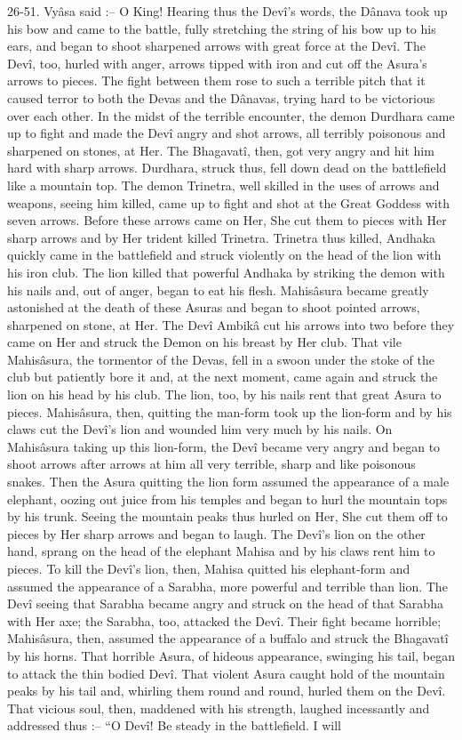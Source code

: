 26-51. Vy\^asa said :-- O King! Hearing thus the Dev\^i's words, the D\^anava took up his bow and came to the battle, fully stretching the string of his bow up to his ears, and began to shoot sharpened arrows with great force at the Dev\^i. The Dev\^i, too, hurled with anger, arrows tipped with iron and cut off the Asura's arrows to pieces. The fight between them rose to such a terrible pitch that it caused terror to both the Devas and the D\^anavas, trying hard to be victorious over each other. In the midst of the terrible encounter, the demon Durdhara came up to fight and made the Dev\^i angry and shot arrows, all terribly poisonous and sharpened on stones, at Her. The Bhagavat\^i, then, got very angry and hit him hard with sharp arrows. Durdhara, struck thus, fell down dead on the battlefield like a mountain top. The demon Trinetra, well skilled in the uses of arrows and weapons, seeing him killed, came up to fight and shot at the Great Goddess with seven arrows. Before these arrows came on Her, She cut them to pieces with Her sharp arrows and by Her trident killed Trinetra. Trinetra thus killed, Andhaka quickly came in the battlefield and struck violently on the head of the lion with his iron club. The lion killed that powerful Andhaka by striking the demon with his nails and, out of anger, began to eat his flesh. Mahis\^asura became greatly astonished at the death of these Asuras and began to shoot pointed arrows, sharpened on stone, at Her. The Dev\^i Ambik\^a cut his arrows into two before they came on Her and struck the Demon on his breast by Her club. That vile Mahis\^asura, the tormentor of the Devas, fell in a swoon under the stoke of the club but patiently bore it and, at the next moment, came again and struck the lion on his head by his club. The lion, too, by his nails rent that great Asura to pieces. Mahis\^asura, then, quitting the man-form took up the lion-form and by his claws cut the Dev\^i's lion and wounded him very much by his nails. On Mahis\^asura taking up this lion-form, the Dev\^i became very angry and began to shoot arrows after arrows at him all very terrible, sharp and like poisonous snakes. Then the Asura quitting the lion form assumed the appearance of a male elephant, oozing out juice from his temples and began to hurl the mountain tops by his trunk. Seeing the mountain peaks thus hurled on Her, She cut them off to pieces by Her sharp arrows and began to laugh. The Dev\^i's lion on the other hand, sprang on the head of the elephant Mahisa and by his claws rent him to pieces. To kill the Dev\^i's lion, then, Mahisa quitted his elephant-form and assumed the appearance of a Sarabha, more powerful and terrible than lion. The Dev\^i seeing that Sarabha became angry and struck on the head of that Sarabha with Her axe; the Sarabha, too, attacked the Dev\^i. Their fight became horrible; Mahis\^asura, then, assumed the appearance of a buffalo and struck the Bhagavat\^i by his horns. That horrible Asura, of hideous appearance, swinging his tail, began to attack the thin bodied Dev\^i. That violent Asura caught hold of the mountain peaks by his tail and, whirling them round and round, hurled them on the Dev\^i. That vicious soul, then, maddened with his strength, laughed incessantly and addressed thus :-- ``O Dev\^i! Be steady in the battlefield. I will 